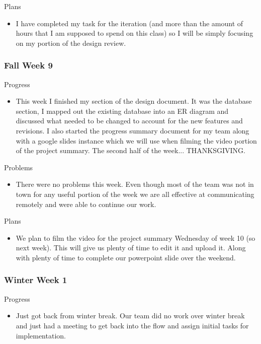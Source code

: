         \noindent
        Plans
        \begin{itemize}
            \item I have completed my task for the iteration (and more than the amount of hours that I am supposed to spend on this class) so I will be simply focusing on my portion of the design review.
        \end{itemize}
        
    \subsubsection{Fall Week 9}
    
        \noindent
        Progress
        \begin{itemize}
            \item This week I finished my section of the design document.  It was the database section, I mapped out the existing database into an ER diagram and discussed what needed to be changed to account for the new features and revisions.  I also started the progress summary document for my team along with a google slides instance which we will use when filming the video portion of the project summary.  The second half of the week... THANKSGIVING.
        \end{itemize}
        
        \noindent
        Problems
        \begin{itemize}
            \item There were no problems this week.  Even though most of the team was not in town for any useful portion of the week we are all effective at communicating remotely and were able to continue our work.
        \end{itemize}
        
        \noindent
        Plans
        \begin{itemize}
            \item We plan to film the video for the project summary Wednesday of week 10 (so next week).  This will give us plenty of time to edit it and upload it.  Along with plenty of time to complete our powerpoint slide over the weekend.
        \end{itemize}
        
    \subsubsection{Winter Week 1}
    
        \noindent
        Progress
        \begin{itemize}
            \item Just got back from winter break.  Our team did no work over winter break and just had a meeting to get back into the flow and assign initial tasks for implementation.
        \end{itemize}
        
